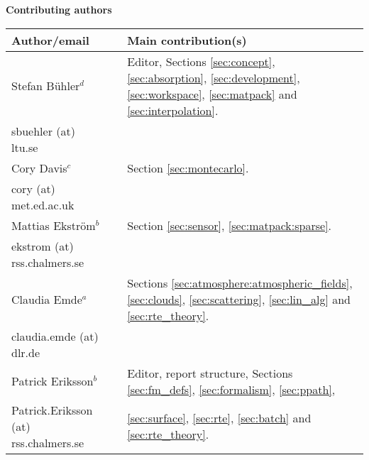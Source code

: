 %
\newpage
\thispagestyle{plain}
%
\begin{center}

{\Large \bf Contributing authors}
\vspace*{20mm}

\begin{tabular}{lp{10mm}l}
\hline
{\bf Author/email} & & {\bf Main contribution(s)} \\
\hline
  Stefan B\"uhler$^d$ & & Editor, Sections \ref{sec:concept},  
     \ref{sec:absorption}, \ref{sec:development}, \ref{sec:workspace},
     \ref{sec:matpack} and \ref{sec:interpolation}.\\
  sbuehler (at) ltu.se & &        \\
\hline
  Cory Davis$^c$ & & Section \ref{sec:montecarlo}. \\
  cory (at) met.ed.ac.uk & & \\
\hline
  Mattias Ekstr\"om$^b$ & & Section \ref{sec:sensor}, 
     \ref{sec:matpack:sparse}. \\
  ekstrom (at) rss.chalmers.se & & \\
\hline
 Claudia Emde$^a$ & & Sections  \ref{sec:atmosphere:atmospheric_fields},
 \ref{sec:clouds}, \ref{sec:scattering},
 \ref{sec:lin_alg} and \ref{sec:rte_theory}.\\
 claudia.emde (at) dlr.de & & \\
\hline
  Patrick Eriksson$^b$ &  & Editor, report structure, 
    Sections \ref{sec:fm_defs}, \ref{sec:formalism}, \ref{sec:ppath}, \\
  Patrick.Eriksson (at) rss.chalmers.se & & 
    \ref{sec:surface}, \ref{sec:rte}, \ref{sec:batch} and 
    \ref{sec:rte_theory}.\\


\end{tabular}
\end{center}
